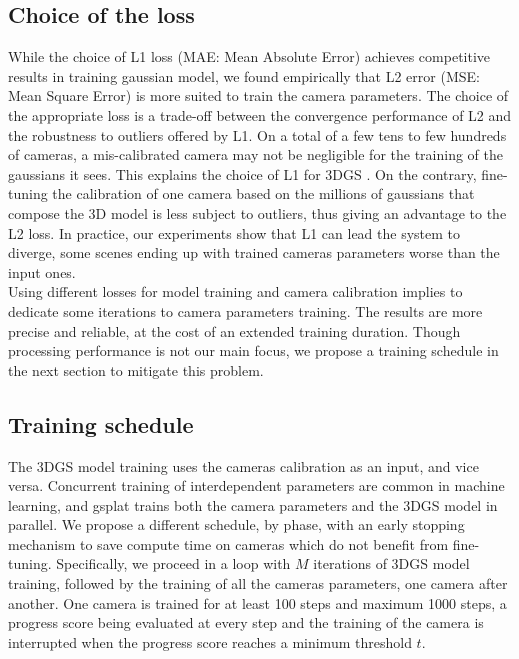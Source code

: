 \documentclass[a4paper,twoside,french]{article}
\begin{document}
\subsection{Choice of the loss} \label{L2}
While the choice of L1 loss (MAE: Mean Absolute Error)
achieves competitive results in training gaussian model, we
found empirically that L2 error (MSE: Mean Square Error)
is more suited to train the camera parameters. The choice
of the appropriate loss is a trade-off between the convergence
performance of L2 and the robustness to outliers
offered by L1. On a total of a few tens to few hundreds
of cameras, a mis-calibrated camera may not be negligible
for the training of the gaussians it sees. This explains
the choice of L1 for 3DGS \cite{kerbl20233d}. On the contrary, fine-tuning
the calibration of one camera based on the millions of gaussians
that compose the 3D model is less subject to outliers,
thus giving an advantage to the L2 loss. In practice, our
experiments show that L1 can lead the system to diverge,
some scenes ending up with trained cameras parameters
worse than the input ones. \\
Using different losses for model training and camera calibration
implies to dedicate some iterations to camera parameters
training. The results are more precise and reliable,
at the cost of an extended training duration. Though processing
performance is not our main focus, we propose a
training schedule in the next section to mitigate this problem.


\subsection{Training schedule} \label{schedule}
The 3DGS model training uses the cameras calibration as an input, and vice versa. Concurrent training of interdependent
parameters are common in machine learning, and gsplat \cite{ye2024gsplat} trains both the camera parameters and the 3DGS
model in parallel.
We propose a different schedule, by phase, with an early stopping mechanism to save compute time on cameras which do not 
benefit from fine-tuning. Specifically, we proceed in a loop with $M$ iterations of 3DGS model training, followed by the training of all the cameras parameters, one camera
after another. One camera is trained for at least 100 steps and maximum 1000 steps, a progress score being evaluated at every step and
the training of the camera is interrupted when the progress score reaches a minimum threshold $t$.
\end{document}
